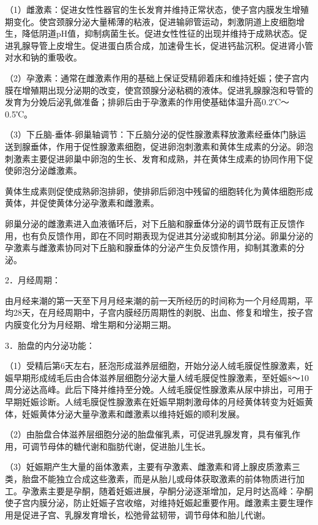 \documentclass[12pt,UTF8]{ctexbook}
\begin{document}
（1）雌激素：促进女性性器官的生长发育并维持正常状态，使子宫内膜发生增殖期变化。使宫颈腺分泌大量稀薄的粘液，促进输卵管运动，刺激阴道上皮细胞增生，降低阴道pH值，抑制病菌生长。促进女性性征的出现并维持于成熟状态。促进乳腺导管上皮增生。促进蛋白质合成，加速骨生长，促进钙盐沉积。促进肾小管对水和钠的重吸收。

（2）孕激素：通常在雌激素作用的基础上保证受精卵着床和维持妊娠；使子宫内膜在增殖期出现分泌期的改变，使宫颈腺分泌粘稠的液体。促进乳腺腺泡和导管的发育为分娩后泌乳做准备；排卵后由于孕激素的作用使基础体温升高0.2℃～0.5℃。

（3）下丘脑-垂体-卵巢轴调节：下丘脑分泌的促性腺激素释放激素经垂体门脉运送到腺垂体，作用于促性腺激素细胞，促进卵泡刺激素和黄体生成素的分泌。卵泡刺激素主要促进卵巢中卵泡的生长、发育和成熟，并在黄体生成素的协同作用下促使卵泡分泌雌激素。

黄体生成素则促使成熟卵泡排卵，使排卵后卵泡中残留的细胞转化为黄体细胞形成黄体，并促使黄体分泌孕激素和雌激素。

卵巢分泌的雌激素进入血液循环后，对下丘脑和腺垂体分泌的调节既有正反馈作用，也有负反馈作用，即在不同时期表现为促进其分泌或抑制其分泌。卵巢分泌的孕激素与雌激素协同对下丘脑和腺垂体的分泌产生负反馈作用，抑制其激素的分泌。

2．月经周期：

由月经来潮的第一天至下月月经来潮的前一天所经历的时间称为一个月经周期，平均28天，在月经周期中，子宫内膜经历周期性的剥脱、出血、修复和增生，按子宫内膜变化分为月经期、增生期和分泌期三期。

3．胎盘的内分泌功能：

（1）受精后第6天左右，胚泡形成滋养层细胞，开始分泌人绒毛膜促性腺激素，妊娠早期形成绒毛后由合体滋养层细胞分泌大量人绒毛膜促性腺激素，至妊娠8～10周分泌达高峰。此后下降并维持至分娩。人绒毛膜促性腺激素从尿中排出，可用于早期妊娠诊断。人绒毛膜促性腺激素在妊娠早期刺激母体的月经黄体转变为妊娠黄体，妊娠黄体分泌大量孕激素和雌激素以维持妊娠的顺利发展。

（2）由胎盘合体滋养层细胞分泌的胎盘催乳素，可促进乳腺发育，具有催乳作用，可调节母体的糖代谢和脂肪代谢，促进胎儿生长。

（3）妊娠期产生大量的甾体激素，主要有孕激素、雌激素和肾上腺皮质激素三类，胎盘不能独立合成这些激素，而是从胎儿或母体获取激素的前体物质进行加工。孕激素主要是孕酮，随着妊娠进展，孕酮分泌逐渐增加，足月时达高峰：孕酮使子宫内膜分泌，防止妊娠子宫收缩，对维持妊娠起重要作用。雌激素主要生理作用是促进子宫、乳腺发育增长，松弛骨盆韧带，调节母体和胎儿代谢。
\end{document}
